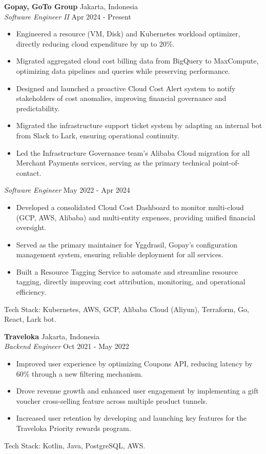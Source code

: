 \documentclass[a4paper]{article}
\begin{document}
\textbf{Gopay, GoTo Group} \hfill Jakarta, Indonesia\\
\textit{Software Engineer II} \hfill Apr 2024 - Present\\
\vspace{-2mm}
\begin{itemize} \itemsep 1pt
    \item Engineered a resource (VM, Disk) and Kubernetes workload optimizer, directly reducing cloud expenditure by up to 20\%.
    \item Migrated aggregated cloud cost billing data from BigQuery to MaxCompute, optimizing data pipelines and queries while preserving performance.
    \item Designed and launched a proactive Cloud Cost Alert system to notify stakeholders of cost anomalies, improving financial governance and predictability.
    \item  Migrated the infrastructure support ticket system by adapting an internal bot from Slack to Lark, ensuring operational continuity.
    \item Led the Infrastructure Governance team's Alibaba Cloud migration for all Merchant Payments services, serving as the primary technical point-of-contact.
\end{itemize}
\textit{Software Engineer} \hfill May 2022 - Apr 2024\\
\begin{itemize} \itemsep 1pt
    \item Developed a consolidated Cloud Cost Dashboard to monitor multi-cloud (GCP, AWS, Alibaba) and multi-entity expenses, providing unified financial oversight.
    \item Served as the primary maintainer for Yggdrasil, Gopay's configuration management system, ensuring reliable deployment for all services.
    \item Built a Resource Tagging Service to automate and streamline resource tagging, directly improving cost attribution, monitoring, and operational efficiency.
\end{itemize}
Tech Stack: Kubernetes, AWS, GCP, Alibaba Cloud (Aliyun), Terraform, Go, React, Lark bot.
\vspace{1.5mm}

\textbf{Traveloka} \hfill Jakarta, Indonesia\\
\textit{Backend Engineer} \hfill Oct 2021 - May 2022\\
\vspace{-2mm}
\begin{itemize} \itemsep 1pt
    \item Improved user experience by optimizing Coupons API, reducing latency by 60\% through a new filtering mechanism.
    \item Drove revenue growth and enhanced user engagement by implementing a gift voucher cross-selling feature across multiple product tunnels.
    \item Increased user retention by developing and launching key features for the Traveloka Priority rewards program.
\end{itemize}
Tech Stack: Kotlin, Java, PostgreSQL, AWS.
\vspace{1.5mm}
\end{document}

